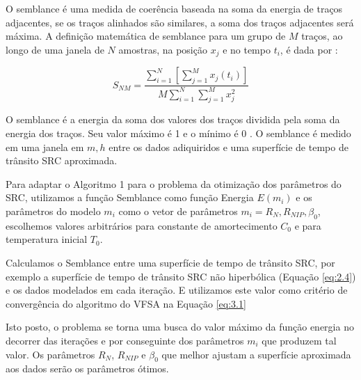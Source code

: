O semblance é uma medida de coerência baseada na soma da energia de traços adjacentes, se os traços alinhados são similares,
a soma dos traços adjacentes será máxima. A definição matemática de semblance para um grupo de $M$ traços, ao 
longo de uma janela de $N$ amostras, na posição $x_j$ e no tempo $t_i$, é dada por \cite{seg}:

\begin{equation}
\label{eq:3.9}
 S_{NM}=\frac{ \sum_{i=1}^N [\sum_{j=1}^M x_j(t_i)]}{M \sum_{i=1}^N \sum_{j=1}^Mx^2_{j}}
\end{equation}

O semblance é a energia da soma dos valores dos traços dividida pela soma da energia dos traços. 
Seu valor máximo é 1 e o mínimo é 0 \cite{seg}. O semblance é medido em uma janela em $m, h$ entre os dados adiquiridos 
e uma superfície de tempo de
trânsito SRC aproximada. 

Para adaptar o Algoritmo 1 para o problema da otimização dos parâmetros do SRC, utilizamos a
função Semblance como função Energia $E(m_i)$ e os parâmetros do modelo $m_i$ como o vetor
de parâmetros $m_i={R_N,R_{NIP},\beta_0}$, escolhemos valores arbitrários para constante de amortecimento $C_0$ e
para temperatura inicial $T_0$.

Calculamos o Semblance entre uma superfície de tempo de trânsito SRC, por exemplo a
superfície de tempo de trânsito SRC não hiperbólica (Equação \ref{eq:2.4}) 
e os dados modelados em cada iteração. E utilizamos este valor como critério de
convergência do algoritmo do VFSA na Equação \ref{eq:3.1} 

Isto posto, o problema se torna
uma busca do valor máximo da função energia no decorrer das iterações e por conseguinte dos parâmetros $m_i$ que
produzem tal valor. Os parâmetros $R_N$, $R_{NIP}$ e $\beta_0$ que melhor
ajustam a superfície aproximada aos dados serão os parâmetros ótimos.